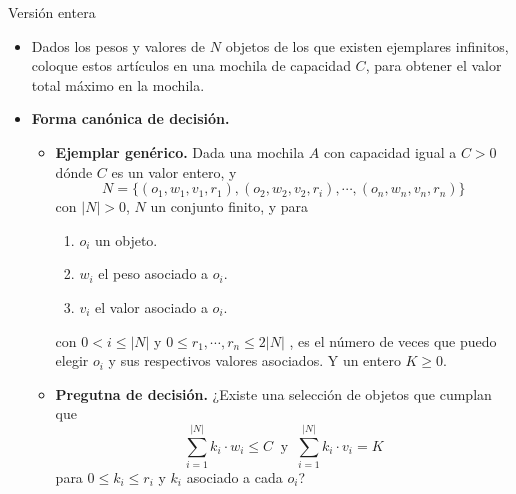 \begin{frame}{Versión entera}
     \begin{itemize}[<+->]
     \item Dados los pesos y valores de $N$ objetos de los que existen ejemplares infinitos, coloque estos artículos
       en una mochila de capacidad $C$, para obtener el valor total máximo en la mochila.
       
     \item \textbf{Forma canónica de decisión.}
       \begin{itemize}[<+->]
       \item \textbf{Ejemplar genérico.} Dada una mochila $A$ con capacidad igual a $C > 0$
         dónde $C$ es un valor entero, y
         \[N = \{(o_1, w_1, v_1, r_1), (o_2, w_2, v_2, r_i), \dotsm, (o_n, w_n, v_n, r_n)\}\]
         con $|N| > 0$, $N$ un conjunto finito,  y para
         \begin{enumerate}
         \item $o_i$ un objeto. 
         \item $w_i$ el peso asociado a $o_i$.
         \item $v_i$ el valor asociado a $o_i$.
         \end{enumerate}
         con $0 < i \leq |N|$ y $0 \leq r_1, \dotsm, r_n \leq 2|N|$ , es el número de veces que
         puedo elegir $o_i$ y sus respectivos valores asociados. Y un entero $K \geq 0$. 
       \item \textbf{Pregutna de decisión.} ¿Existe una selección de objetos que cumplan que
         \[\sum_{i=1}^{|N|} k_i \cdot w_i \leq C\ \text{  y  }\ \sum_{i=1}^{|N|} k_i \cdot v_i = K\]
         para $0 \leq k_i \leq r_i$ y $k_i$ asociado a cada $o_i$?
       \end{itemize}
     \end{itemize}
\end{frame}
